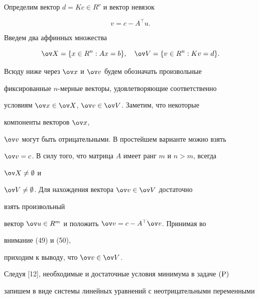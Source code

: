 Определим вектор $d=K c\in R^\nu$ и вектор невязок


\begin{equation}


v=c-A^\top u.


\end{equation}





Введем два аффинных множества


$$


\ov X=\{x\in R^n:Ax=b\},\quad


\ov V=\{v\in R^n:K v=d\}.


$$


Всюду ниже через $\ov x$ и $\ov v$ будем обозначать произвольные


фиксированные $n$-мерные векторы, удовлетворяющие соответственно


условиям $\ov x\in\ov X$, $\ov v\in\ov V$. Заметим, что некоторые 


компоненты векторов $\ov x$,


$\ov v$ могут быть отрицательными. В простейшем варианте можно взять


$\ov v=c$. В силу того, что матрица $A$ имеет ранг $m$ и $n>m$, всегда 


$\ov X\ne\emptyset$ и


$\ov V\ne\emptyset$. Для нахождения вектора $\ov v\in \ov V$ достаточно 


взять произвольный


вектор $\ov u\in R^m$ и положить $\ov v=c-A^\top\ov v$. Принимая во 


внимание (49) и (50),


приходим к выводу, что $\ov v\in\ov V$.





Следуя [12], необходимые и достаточные условия минимума в задаче $(\mathrm P)$


запишем в виде системы линейных уравнений с неотрицательными переменными


